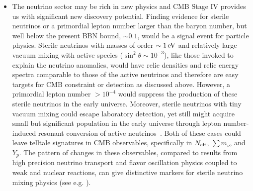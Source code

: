 \begin{itemize}
\item The neutrino sector may be rich in new physics and CMB Stage IV provides us with significant new discovery potential. Finding evidence for sterile neutrinos or a primordial lepton number larger than the baryon number, but well below the present BBN bound, $\sim 0.1$, would be a signal event for particle physics. Sterile neutrinos with masses of order $\sim 1\,{\rm eV}$ and relatively large vacuum mixing with active species ($\sin^2 \theta \sim 10^{-3}$), like those invoked to explain the neutrino anomalies, would have relic densities and relic energy spectra comparable to those of the active neutrinos and therefore are easy targets for CMB constraint or detection as discussed above. However, a primordial lepton number $> {10}^{-4}$ would suppress the production of these sterile neutrinos in the early universe. Moreover, sterile neutrinos with tiny vacuum mixing could escape laboratory detection, yet still might acquire small but significant population in the early universe through lepton number-induced resonant conversion of active neutrinos~\cite{Abazajian:2005gj}. Both of these cases could leave telltale signatures in CMB observables, specifically in $N_{\rm eff}$, $\sum m_\nu$, and $Y_p$. The pattern of changes in these observables, compared to results from high precision neutrino transport and flavor oscillation physics coupled to weak and nuclear reactions, can give distinctive markers for sterile neutrino mixing physics (see e.g. \cite{Smith:2006uw, Grohs:2015tfy}).

\end{itemize}

